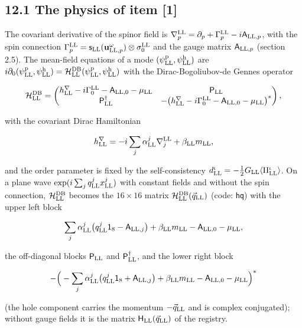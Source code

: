 \documentclass[
  10pt,
]{article}
\begin{document}
\hypertarget{the-physics-of-item-1}{%
\subsection{12.1 The physics of item
{[}1{]}}\label{the-physics-of-item-1}}

The covariant derivative of the spinor field is
\(\nabla^{\rm LL}_p=\partial_p+\Gamma^{\rm LL}_p-i\mathsf A_{{\rm LL},p}\),
with the spin connection
\(\Gamma^{\rm LL}_p=\mathsf s_{\rm LL}(\mathbf u^\omega_{{\rm LL},p})\otimes\sigma^{\rm LL}_0\)
and the gauge matrix \(\mathsf A_{{\rm LL},p}\) (section 2.5). The
mean-field equations of a mode
\((\psi^{\rm p}_{\rm LL},\psi^{\rm h}_{\rm LL})\) are
\(i\partial_0(\psi^{\rm p}_{\rm LL},\psi^{\rm h}_{\rm LL})=\mathcal H^{\rm DB}_{\rm LL}(\psi^{\rm p}_{\rm LL},\psi^{\rm h}_{\rm LL})\)
with the Dirac-Bogoliubov-de Gennes operator

\[\mathcal H^{\rm DB}_{\rm LL}=\begin{pmatrix}h^\nabla_{\rm LL}-i\Gamma^{\rm LL}_0-\mathsf A_{{\rm LL},0}-\mu_{\rm LL}&\mathsf P_{\rm LL}\\\mathsf P_{\rm LL}^\dagger&-\big(h^\nabla_{\rm LL}-i\Gamma^{\rm LL}_0-\mathsf A_{{\rm LL},0}-\mu_{\rm LL}\big)^*\end{pmatrix},\]

with the covariant Dirac Hamiltonian

\[h^\nabla_{\rm LL}=-i\sum_j\alpha^j_{\rm LL}\nabla^{\rm LL}_j+\beta_{\rm LL}m_{\rm LL},\]

and the order parameter is fixed by the self-consistency
\(d^\iota_{\rm LL}=-\tfrac12G_{\rm LL}\langle\Pi^\iota_{\rm LL}\rangle\).
On a plane wave \(\exp(i\sum_jq^j_{\rm LL}x^j_{\rm LL})\) with constant
fields and without the spin connection, \(\mathcal H^{\rm DB}_{\rm LL}\)
becomes the \(16\times16\) matrix
\(\mathcal H^{\rm DB}_{\rm LL}(\vec q_{\rm LL})\) (code: \texttt{hq})
with the upper left block

\[\sum_j\alpha^j_{\rm LL}\big(q^j_{\rm LL}\mathsf 1_8-\mathsf A_{{\rm LL},j}\big)+\beta_{\rm LL}m_{\rm LL}-\mathsf A_{{\rm LL},0}-\mu_{\rm LL},\]

the off-diagonal blocks \(\mathsf P_{\rm LL}\) and
\(\mathsf P_{\rm LL}^\dagger\), and the lower right block

\[-\Big(-\sum_j\alpha^j_{\rm LL}\big(q^j_{\rm LL}\mathsf 1_8+\mathsf A_{{\rm LL},j}\big)+\beta_{\rm LL}m_{\rm LL}-\mathsf A_{{\rm LL},0}-\mu_{\rm LL}\Big)^*\]

(the hole component carries the momentum \(-\vec q_{\rm LL}\) and is
complex conjugated); without gauge fields it is the matrix
\(\mathsf H_{\rm LL}(\vec q_{\rm LL})\) of the registry.
\end{document}
